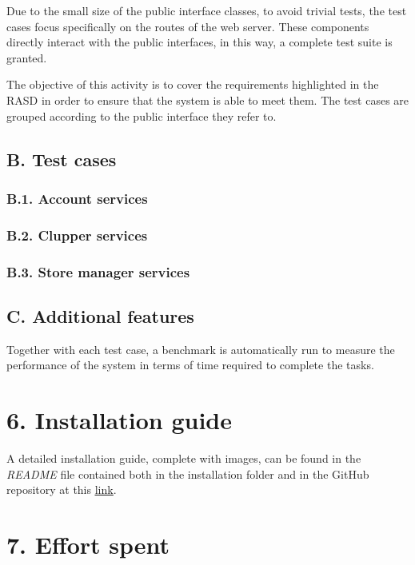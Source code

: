 Due to the small size of the public interface classes, to avoid trivial tests, the test cases focus specifically on the routes of the web server.
These components directly interact with the public interfaces, in this way, a complete test suite is granted.

The objective of this activity is to cover the requirements highlighted in the RASD in order to ensure that the system is able to meet them.
The test cases are grouped according to the public interface they refer to.

\section{B. Test cases}

\subsection{B.1. Account services}

\subsection{B.2. Clupper services}

\subsection{B.3. Store manager services}

\section{C. Additional features}

Together with each test case, a benchmark is automatically run to measure the performance of the system in terms of time required to complete the tasks.

\chapter{6. Installation guide}

A detailed installation guide, complete with images, can be found in the \emph{README} file contained both in the installation folder and in the GitHub repository at this \underline{\href{https://github.com/ferrohd/FerraraFratus/tree/main/CLup}{link}}.

\chapter{7. Effort spent}

